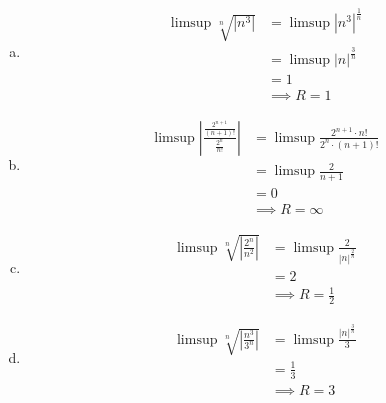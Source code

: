 \documentclass[11pt]{article}
\begin{document}
\begin{exercise}{9}
    \begin{enumerate} [(a)]
        \item \begin{solution}
            \begin{equation*}
                \begin{split}
                    \limsup \sqrt[n]{|n^3|} & = \limsup |n^3|^{\frac{1}{n}} \\ 
                    & = \limsup |n|^{\frac{3}{n}} \\
                    & = 1 \\
                    & \implies R = 1
                \end{split}
            \end{equation*}
        \end{solution}
        \item \begin{solution}
            \begin{equation*}
                \begin{split}
                    \limsup \left| \frac{\frac{2^{n+1}}{(n+1)!}}{\frac{2^n}{n!}} \right| & = \limsup \frac{2^{n+1} \cdot n!}{2^n \cdot (n+1)!} \\
                    & = \limsup \frac{2}{n+1} \\
                    & = 0 \\
                    & \implies R = \infty
                \end{split}
            \end{equation*}
        \end{solution}
        \item \begin{solution}
            \begin{equation*}
                \begin{split}
                    \limsup \sqrt[n]{\left| \frac{2^n}{n^2} \right|} & = \limsup \frac{2}{|n|^{\frac{2}{n}}} \\
                    & = 2 \\
                    & \implies R = \frac{1}{2}
                \end{split}
            \end{equation*}
        \end{solution}
        \item \begin{solution}
            \begin{equation*}
                \begin{split}
                    \limsup \sqrt[n]{\left| \frac{n^3}{3^n} \right|} & = \limsup \frac{|n|^{\frac{3}{n}}}{3} \\ 
                    & = \frac{1}{3} \\
                    & \implies R = 3
                \end{split}
            \end{equation*}
        \end{solution}
    \end{enumerate}
\end{exercise}
\end{document}
